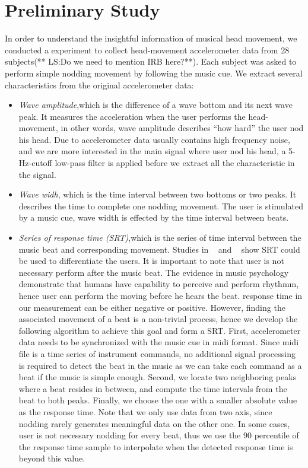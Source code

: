 \section{Preliminary Study}
In order to understand the insightful information of musical head movement, we conducted a experiment to collect head-movement accelerometer data from 28 subjects(** LS:Do we need to mention IRB here?**). Each subject was asked to perform simple nodding movement by following the music cue.  We extract several characteristics from the original accelerometer data:
\begin{itemize}
\item{\em Wave amplitude},which is the difference of a wave bottom and its next wave peak. It measures the acceleration when the user performs the head-movement, in other words, wave amplitude describes “how hard” the user nod his head. Due to accelerometer data usually contains high frequency noise, and we are more interested in the main signal where user nod his head, a 5-Hz-cutoff low-pass filter is applied before we extract all the characteristic in the signal.   
\item{\em Wave widh}, which is the time interval between two bottoms or two peaks. It describes the time to complete one nodding movement. The user is stimulated by a music cue, wave width is effected by the time interval between beats.
\item{\em Series of response time (SRT)},which is the series of time interval between the music beat and corresponding movement.  Studies in ~\cite{westeyn2004recognizing} and ~\cite{wobbrock2009tapsongs} show SRT could be used to differentiate the users. It is important to note that user is not necessary perform after the music beat. The evidence in music psychology ~\cite{clarke1999rhythm,fraisse1982rhythm} demonstrate that  humans have capability to perceive and perform rhythmm, hence user can perform the moving before he hears the beat.
response time in our measurement can be either negative or positive. However, finding the associated movement of a beat is a non-trivial process, hence we develop the following algorithm to achieve this goal and form a SRT. First, accelerometer data needs to be synchronized with the music cue in midi format. Since midi file is a time series of instrument commands,  no additional signal processing is required to detect the beat in the music as we can take each command as a beat if the music is simple enough. Second, we locate two neighboring peaks where a beat resides in between, and compute the time intervals from the beat to both peaks. Finally, we choose the one with a smaller absolute value as the response time. Note that we only use data from two axis, since nodding rarely generates meaningful data on the other one. In some cases,  user is not necessary nodding for every beat,  thus we use the 90 percentile of the response time sample to interpolate  when the detected response time is beyond this value. 
\end{itemize}
